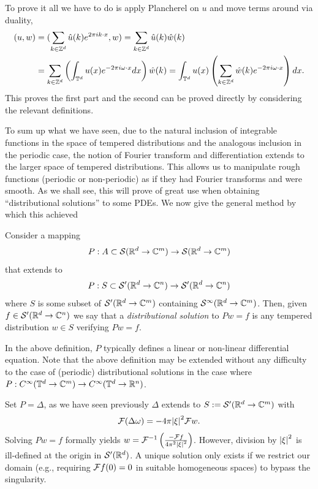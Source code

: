 \documentclass[
    a4paper,
    DIV=14,
    abstract=true,
    numbers=noenddot
]{scrartcl}
\begin{document}
To prove it all we have to do is apply Plancherel on $u$ and move terms around via duality,
\begin{align*}
	(u,w)&=(\sum_{k\in \mathbb{Z}^d}\hat{u}(k)e^{2\pi ik\cdot x},w )=\sum_{k\in \mathbb{Z}^d}  \hat{u}(k)\hat{w}(k)\\&
=\sum_{k\in \mathbb{Z}^d}  \left(\int_{\mathbb{T}^d} u(x)e^{-2\pi i\omega\cdot  x}dx\right)\hat{w}(k)=\int_{\mathbb{T}^d} u(x)\left(\sum_{k\in \mathbb{Z}^d} \hat{w}(k) e^{-2\pi i\omega\cdot  x}\right)dx.
\end{align*}
This proves the first part and the second can be proved directly by considering the relevant definitions.



To sum up what we have seen, due to the natural inclusion of integrable functions in the space of tempered distributions and the analogous inclusion in the periodic case, the notion of Fourier transform and differentiation extends to the larger space of tempered distributions. This allows us to manipulate rough functions (periodic or non-periodic) as if they had Fourier transforms and were smooth. As we shall see, this will prove of great use when obtaining ``distributional solutions'' to some PDEs. We now give the general method by which this achieved
\begin{definition}
	Consider a mapping
	\[P:A\subset\mathcal{S}(\mathbb{R}^d\to\mathbb{C}^m)\to \mathcal{S}(\mathbb{R}^d\to\mathbb{C}^m)\]
	that extends to
	\[P:S\subset \mathcal{S}'(\mathbb{R}^d\to\mathbb{C}^n)\to \mathcal{S}'(\mathbb{R}^d\to\mathbb{C}^n)\]
	where $S$  is some subset of ${\mathcal{S}'}(\mathbb{R}^d\to\mathbb{C}^m)$ containing $\mathcal{S}^\infty(\mathbb{R}^d\to\mathbb{C}^m)$. Then, given $f \in \mathcal{S}'(\mathbb{R}^d\to \mathbb{C}^n)$ we say that a \emph{distributional solution} to $Pw=f$ is any tempered distribution $w\in S$ verifying
	$Pw=f$.
\end{definition}
In the above definition, $P$ typically defines a linear or non-linear differential equation. Note that the above definition may be extended without any difficulty to the case of (periodic) distributional solutions in the case where $P: C^\infty(\mathbb{T}^d\to\mathbb{C}^m)\to C^\infty(\mathbb{T}^d\to\mathbb{R}^n)$.
\begin{example}
	Set $P=\Delta $, as we have seen previously $\Delta$ extends to $S:=\mathcal{S}'(\mathbb{R}^d\to\mathbb{C}^m)$ with
	\begin{equation*}
		\mathcal{F}(\Delta \omega)=-4\pi {\left| \xi  \right|}^2\mathcal{F} w .
	\end{equation*}
Solving $Pw=f$ formally yields $w=\mathcal{F}^{-1}\left(\frac{-\mathcal{F} f}{4\pi^2 {\left| \xi  \right|}^2 }\right)$. However, division by ${\left| \xi \right|}^2$ is ill-defined at the origin in $\mathcal{S}'(\mathbb{R}^d)$. A unique solution only exists if we restrict our domain (e.g., requiring $\mathcal{F} f(0) = 0$ in suitable homogeneous spaces) to bypass the singularity.
\end{example}
\end{document}
